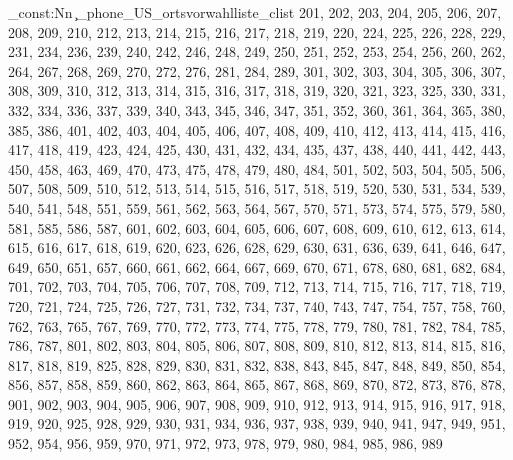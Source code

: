 \clist_const:Nn \c_phone_US_ortsvorwahlliste_clist {201,
202,
203,
204,
205,
206,
207,
208,
209,
210,
212,
213,
214,
215,
216,
217,
218,
219,
220,
224,
225,
226,
228,
229,
231,
234,
236,
239,
240,
242,
246,
248,
249,
250,
251,
252,
253,
254,
256,
260,
262,
264,
267,
268,
269,
270,
272,
276,
281,
284,
289,
301,
302,
303,
304,
305,
306,
307,
308,
309,
310,
312,
313,
314,
315,
316,
317,
318,
319,
320,
321,
323,
325,
330,
331,
332,
334,
336,
337,
339,
340,
343,
345,
346,
347,
351,
352,
360,
361,
364,
365,
380,
385,
386,
401,
402,
403,
404,
405,
406,
407,
408,
409,
410,
412,
413,
414,
415,
416,
417,
418,
419,
423,
424,
425,
430,
431,
432,
434,
435,
437,
438,
440,
441,
442,
443,
450,
458,
463,
469,
470,
473,
475,
478,
479,
480,
484,
501,
502,
503,
504,
505,
506,
507,
508,
509,
510,
512,
513,
514,
515,
516,
517,
518,
519,
520,
530,
531,
534,
539,
540,
541,
548,
551,
559,
561,
562,
563,
564,
567,
570,
571,
573,
574,
575,
579,
580,
581,
585,
586,
587,
601,
602,
603,
604,
605,
606,
607,
608,
609,
610,
612,
613,
614,
615,
616,
617,
618,
619,
620,
623,
626,
628,
629,
630,
631,
636,
639,
641,
646,
647,
649,
650,
651,
657,
660,
661,
662,
664,
667,
669,
670,
671,
678,
680,
681,
682,
684,
701,
702,
703,
704,
705,
706,
707,
708,
709,
712,
713,
714,
715,
716,
717,
718,
719,
720,
721,
724,
725,
726,
727,
731,
732,
734,
737,
740,
743,
747,
754,
757,
758,
760,
762,
763,
765,
767,
769,
770,
772,
773,
774,
775,
778,
779,
780,
781,
782,
784,
785,
786,
787,
801,
802,
803,
804,
805,
806,
807,
808,
809,
810,
812,
813,
814,
815,
816,
817,
818,
819,
825,
828,
829,
830,
831,
832,
838,
843,
845,
847,
848,
849,
850,
854,
856,
857,
858,
859,
860,
862,
863,
864,
865,
867,
868,
869,
870,
872,
873,
876,
878,
901,
902,
903,
904,
905,
906,
907,
908,
909,
910,
912,
913,
914,
915,
916,
917,
918,
919,
920,
925,
928,
929,
930,
931,
934,
936,
937,
938,
939,
940,
941,
947,
949,
951,
952,
954,
956,
959,
970,
971,
972,
973,
978,
979,
980,
984,
985,
986,
989}
